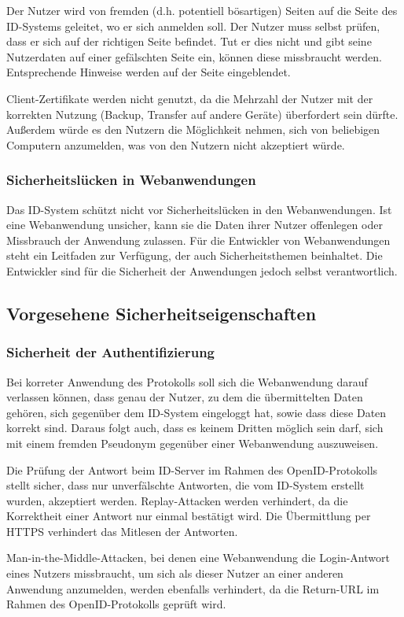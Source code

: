 \documentclass[parskip=half]{scrartcl}
\begin{document}
Der Nutzer wird von fremden (d.h. potentiell bösartigen) Seiten auf die Seite des ID-Systems geleitet, wo er sich anmelden soll.
Der Nutzer muss selbst prüfen, dass er sich auf der richtigen Seite befindet.
Tut er dies nicht und gibt seine Nutzerdaten auf einer gefälschten Seite ein, können diese missbraucht werden.
Entsprechende Hinweise werden auf der Seite eingeblendet.

Client-Zertifikate werden nicht genutzt, da die Mehrzahl der Nutzer mit der korrekten Nutzung (Backup, Transfer auf andere Geräte) überfordert sein dürfte.
Außerdem würde es den Nutzern die Möglichkeit nehmen, sich von beliebigen Computern anzumelden, was von den Nutzern nicht akzeptiert würde.

\subsubsection{Sicherheitslücken in Webanwendungen}
Das ID-System schützt nicht vor Sicherheitslücken in den Webanwendungen.
Ist eine Webanwendung unsicher, kann sie die Daten ihrer Nutzer offenlegen oder Missbrauch der Anwendung zulassen.
Für die Entwickler von Webanwendungen steht ein Leitfaden zur Verfügung, der auch Sicherheitsthemen beinhaltet.
Die Entwickler sind für die Sicherheit der Anwendungen jedoch selbst verantwortlich.

\subsection{Vorgesehene Sicherheitseigenschaften}
\subsubsection{Sicherheit der Authentifizierung}
Bei korreter Anwendung des Protokolls soll sich die Webanwendung darauf verlassen können,
dass genau der Nutzer, zu dem die übermittelten Daten gehören, sich gegenüber dem ID-System eingeloggt hat,
sowie dass diese Daten korrekt sind.
Daraus folgt auch, dass es keinem Dritten möglich sein darf, sich mit einem fremden Pseudonym gegenüber einer Webanwendung auszuweisen.

Die Prüfung der Antwort beim ID-Server im Rahmen des OpenID-Protokolls stellt sicher, dass nur unverfälschte Antworten, die vom ID-System erstellt wurden, akzeptiert werden.
Replay-Attacken werden verhindert, da die Korrektheit einer Antwort nur einmal bestätigt wird.
Die Übermittlung per HTTPS verhindert das Mitlesen der Antworten.

Man-in-the-Middle-Attacken, bei denen eine Webanwendung die Login-Antwort eines Nutzers missbraucht,
um sich als dieser Nutzer an einer anderen Anwendung anzumelden, werden ebenfalls verhindert,
da die Return-URL im Rahmen des OpenID-Protokolls geprüft wird.
\end{document}
